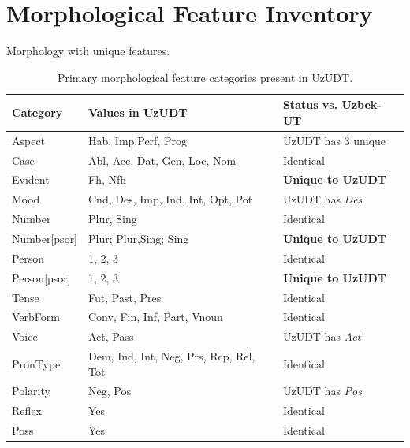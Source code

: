\documentclass[10pt, a4paper]{article}
\begin{document}
\section{Morphological Feature Inventory}
\label{sec:appendix_morph}
Morphology with unique features. 
\begin{table}[htbp]
\centering
\small
\setlength{\tabcolsep}{3pt} %
\begin{tabular}{@{} l p{3.2cm} p{2.6cm} @{}} 
\toprule
\textbf{Category} & \textbf{Values in UzUDT} & \textbf{Status vs. Uzbek-UT} \\
\midrule
Aspect & Hab, Imp,\newline Perf, Prog & UzUDT has 3 unique \\
Case & Abl, Acc, Dat, \newline Gen, Loc, Nom & Identical \\
Evident & Fh, Nfh & \textbf{Unique to UzUDT} \\
Mood & Cnd, Des, Imp, \newline Ind,  Int, Opt, Pot & UzUDT has \textit{Des} \\
Number & Plur, Sing & Identical \\
Number[psor] & Plur; \newline Plur,Sing; Sing & \textbf{Unique to UzUDT} \\
Person & 1, 2, 3 & Identical \\
Person[psor] & 1, 2, 3 & \textbf{Unique to UzUDT} \\
Tense & Fut, Past, Pres & Identical \\
VerbForm & Conv, Fin, Inf, \newline Part, Vnoun & Identical \\
Voice & Act, Pass & UzUDT has \textit{Act} \\
PronType & Dem, Ind, Int, \newline Neg, Prs, Rcp,  \newline Rel, Tot & Identical \\
Polarity & Neg, Pos & UzUDT has \textit{Pos} \\
Reflex & Yes & Identical \\
Poss & Yes & Identical \\
\bottomrule
\end{tabular}
\caption{Primary morphological feature categories present in UzUDT.}
\label{tab:appendix_morph}
\end{table}
\end{document}
